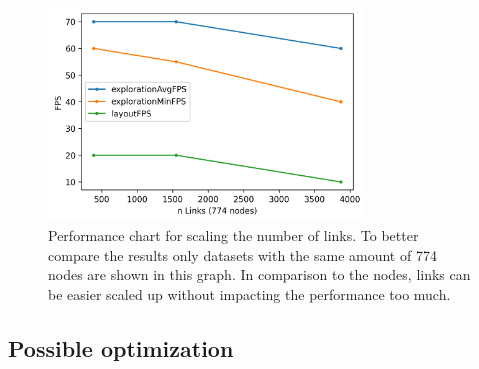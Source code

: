 \begin{figure}[!hbt]
    \centering
    \includegraphics[width=0.75\textwidth]{graphics/performanceAnalysisLinks.png}
    \caption{Performance chart for scaling the number of links. To better compare the results only datasets with the same amount of 774 nodes are shown in this graph. In comparison to the nodes, links can be easier scaled up without impacting the performance too much.} 
    \label{fig:performanceLinks} 
\end{figure}

\subsection{Possible optimization}

